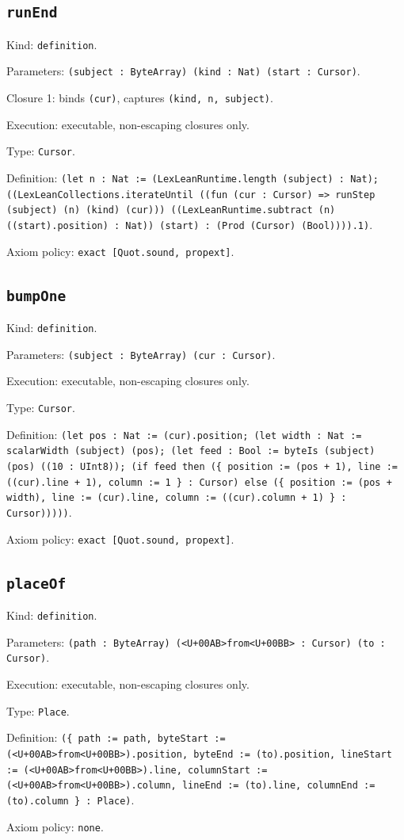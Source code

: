 \documentclass[11pt]{article}
\begin{document}
\subsection*{\texttt{runEnd}}
\noindent Kind: \texttt{definition}.\par
\noindent Parameters: \texttt{(subject : ByteArray) (kind : Nat) (start : Cursor)}.\par
\noindent Closure 1: binds \texttt{(cur)}, captures \texttt{(kind, n, subject)}.\par
\noindent Execution: executable, non-escaping closures only.\par
\noindent Type: \texttt{Cursor}.\par
\noindent Definition: \texttt{(let n : Nat := (LexLeanRuntime.length (subject) : Nat); ((LexLeanCollections.iterateUntil ((fun (cur : Cursor) => runStep (subject) (n) (kind) (cur))) ((LexLeanRuntime.subtract (n) ((start).position) : Nat)) (start) : (Prod (Cursor) (Bool)))).1)}.\par
\noindent Axiom policy: \texttt{exact [Quot.sound, propext]}.\par
\subsection*{\texttt{bumpOne}}
\noindent Kind: \texttt{definition}.\par
\noindent Parameters: \texttt{(subject : ByteArray) (cur : Cursor)}.\par
\noindent Execution: executable, non-escaping closures only.\par
\noindent Type: \texttt{Cursor}.\par
\noindent Definition: \texttt{(let pos : Nat := (cur).position; (let width : Nat := scalarWidth (subject) (pos); (let feed : Bool := byteIs (subject) (pos) ((10 : UInt8)); (if feed then (\{ position := (pos + 1), line := ((cur).line + 1), column := 1 \} : Cursor) else (\{ position := (pos + width), line := (cur).line, column := ((cur).column + 1) \} : Cursor)))))}.\par
\noindent Axiom policy: \texttt{exact [Quot.sound, propext]}.\par
\subsection*{\texttt{placeOf}}
\noindent Kind: \texttt{definition}.\par
\noindent Parameters: \texttt{(path : ByteArray) (<U+00AB>from<U+00BB> : Cursor) (to : Cursor)}.\par
\noindent Execution: executable, non-escaping closures only.\par
\noindent Type: \texttt{Place}.\par
\noindent Definition: \texttt{(\{ path := path, byteStart := (<U+00AB>from<U+00BB>).position, byteEnd := (to).position, lineStart := (<U+00AB>from<U+00BB>).line, columnStart := (<U+00AB>from<U+00BB>).column, lineEnd := (to).line, columnEnd := (to).column \} : Place)}.\par
\noindent Axiom policy: \texttt{none}.\par
\end{document}
